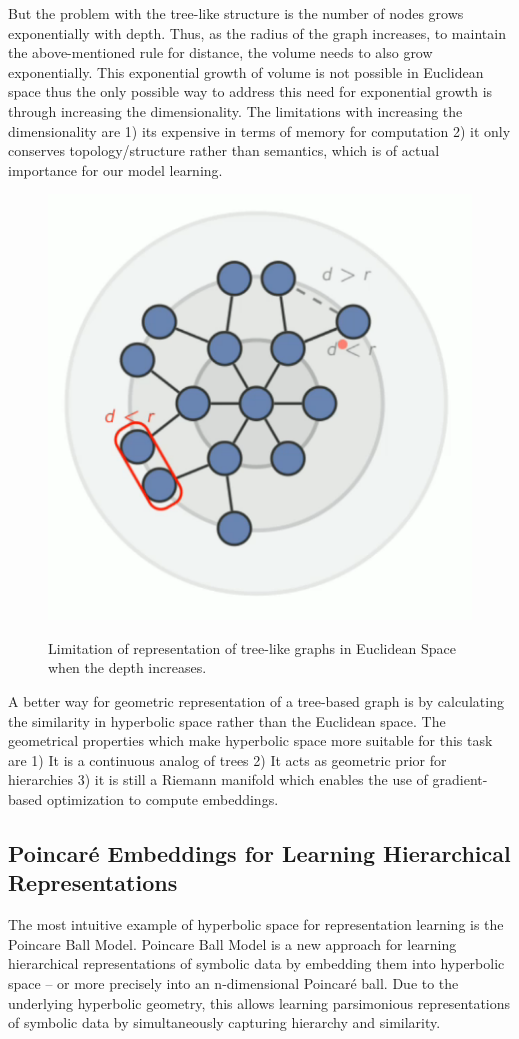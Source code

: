 But the problem with the tree-like structure is the number of nodes grows exponentially with depth. Thus, as the radius of the graph increases, to maintain the above-mentioned rule for distance, the volume needs to also grow exponentially. This exponential growth of volume is not possible in Euclidean space thus the only possible way to address this need for exponential growth is through increasing the dimensionality. The limitations with increasing the dimensionality are 1) its expensive in terms of memory for computation 2) it only conserves topology/structure rather than semantics, which is of actual importance for our model learning.
\begin{figure}
\centering
\includegraphics[width=0.5\linewidth]{figs/tree_graphs_limitation.PNG}
\label{fig:tree_graphs_limitation}
\caption{Limitation of representation of tree-like graphs in Euclidean Space when the depth increases.}
\end{figure}


A better way for geometric representation of a tree-based graph is by calculating the similarity in hyperbolic space rather than the Euclidean space. The geometrical properties which make hyperbolic space more suitable for this task are 1) It is a continuous analog of trees 2) It acts as geometric prior for hierarchies 3) it is still a Riemann manifold which enables the use of gradient-based optimization to compute embeddings.

\subsection{Poincaré Embeddings for
Learning Hierarchical Representations}

The most intuitive example of hyperbolic space for representation learning is the Poincare Ball Model. Poincare Ball Model is a new approach for learning hierarchical representations of symbolic data by embedding them into hyperbolic space – or more precisely into an n-dimensional Poincaré ball. Due to the underlying hyperbolic geometry, this allows learning parsimonious representations of symbolic data by simultaneously capturing hierarchy and similarity.

